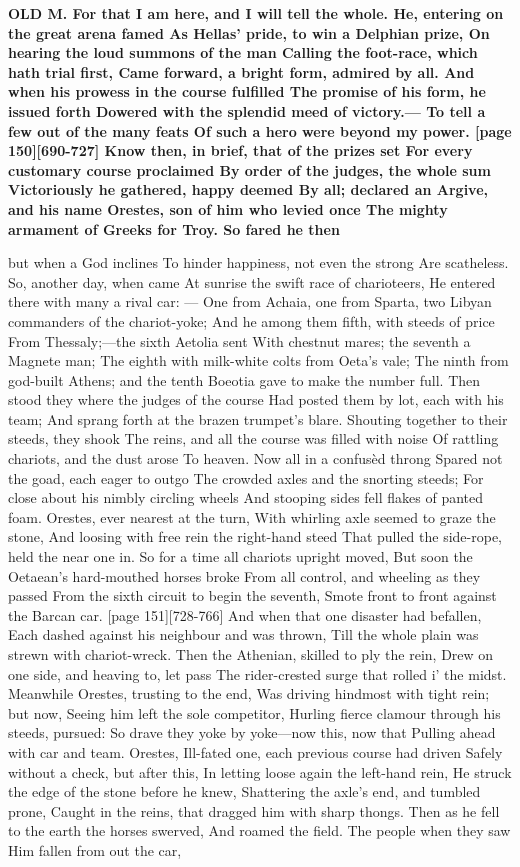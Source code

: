 \documentclass[11pt,letter]{book}
\begin{document}
\par \textbf{OLD M. For that I am here, and I will tell the whole. He, entering on the great arena famed As Hellas’ pride, to win a Delphian prize, On hearing the loud summons of the man Calling the foot-race, which hath trial first, Came forward, a bright form, admired by all. And when his prowess in the course fulfilled The promise of his form, he issued forth Dowered with the splendid meed of victory.— To tell a few out of the many feats Of such a hero were beyond my power. [page 150][690-727] Know then, in brief, that of the prizes set For every customary course proclaimed By order of the judges, the whole sum Victoriously he gathered, happy deemed By all; declared an Argive, and his name Orestes, son of him who levied once The mighty armament of Greeks for Troy. So fared he then}
\par   but when a God inclines To hinder happiness, not even the strong Are scatheless. So, another day, when came At sunrise the swift race of charioteers, He entered there with many a rival car: — One from Achaia, one from Sparta, two Libyan commanders of the chariot-yoke; And he among them fifth, with steeds of price From Thessaly;—the sixth Aetolia sent With chestnut mares; the seventh a Magnete man; The eighth with milk-white colts from Oeta’s vale; The ninth from god-built Athens; and the tenth Boeotia gave to make the number full. Then stood they where the judges of the course Had posted them by lot, each with his team; And sprang forth at the brazen trumpet’s blare. Shouting together to their steeds, they shook The reins, and all the course was filled with noise Of rattling chariots, and the dust arose To heaven. Now all in a confusèd throng Spared not the goad, each eager to outgo The crowded axles and the snorting steeds; For close about his nimbly circling wheels And stooping sides fell flakes of panted foam. Orestes, ever nearest at the turn, With whirling axle seemed to graze the stone, And loosing with free rein the right-hand steed That pulled the side-rope, held the near one in. So for a time all chariots upright moved, But soon the Oetaean’s hard-mouthed horses broke From all control, and wheeling as they passed From the sixth circuit to begin the seventh, Smote front to front against the Barcan car. [page 151][728-766] And when that one disaster had befallen, Each dashed against his neighbour and was thrown, Till the whole plain was strewn with chariot-wreck. Then the Athenian, skilled to ply the rein, Drew on one side, and heaving to, let pass The rider-crested surge that rolled i’ the midst. Meanwhile Orestes, trusting to the end, Was driving hindmost with tight rein; but now, Seeing him left the sole competitor, Hurling fierce clamour through his steeds, pursued:  So drave they yoke by yoke—now this, now that Pulling ahead with car and team. Orestes, Ill-fated one, each previous course had driven Safely without a check, but after this, In letting loose again the left-hand rein, He struck the edge of the stone before he knew, Shattering the axle’s end, and tumbled prone, Caught in the reins, that dragged him with sharp thongs. Then as he fell to the earth the horses swerved, And roamed the field. The people when they saw Him fallen from out the car, 
\end{document}
